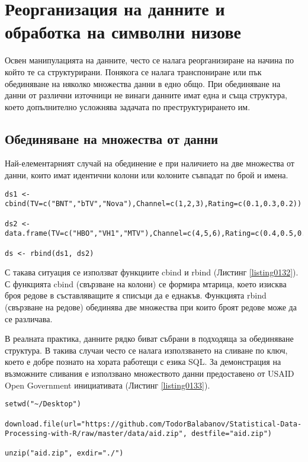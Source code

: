 ﻿\newpage
\chapter{Реорганизация на данните и обработка на символни низове}
\label{chapter07}

Освен манипулацията на данните, често се налага реорганизиране на начина по който те са структурирани. Понякога се налага транспониране или пък обединяване на няколко множества данни в едно общо. При обединяване на данни от различни източници не винаги данните имат една и съща структура, което допълнително усложнява задачата по преструктурирането им. 

\section{Обединяване на множества от данни}

Най-елементарният случай на обединение е при наличието на две множества от данни, които имат идентични колони или колоните съвпадат по брой и имена.

\begin{lstlisting}[caption=Обединяване на множества от данни, label=listing0132]
ds1 <- cbind(TV=c("BNT","bTV","Nova"),Channel=c(1,2,3),Rating=c(0.1,0.3,0.2))

ds2 <- data.frame(TV=c("HBO","VH1","MTV"),Channel=c(4,5,6),Rating=c(0.4,0.5,0.6),stringsAsFactors=FALSE)

ds <- rbind(ds1, ds2)
\end{lstlisting}

С такава ситуация се използват функциите cbind и rbind (Листинг \ref{listing0132}). С функцията cbind (свързване на колони) се формира мтарица, което изисква броя редове в съставляващите я списъци да е еднакъв. Функцията rbind (свързване на редове) обединява две множества при които броят редове може да се различава. 

В реалната практика, данните рядко биват събрани в подходяща за обединяване структура. В такива случаи често се налага използването на сливане по ключ, което е добре познато на хората работещи с езика SQL. За демонстрация на възможните сливания е използвано множеството данни предоставено от USAID Open Government инициативата (Листинг \ref{listing0133}). 

\begin{lstlisting}[caption=USAID множество от данни, label=listing0133]
setwd("~/Desktop")

download.file(url="https://github.com/TodorBalabanov/Statistical-Data-Processing-with-R/raw/master/data/aid.zip", destfile="aid.zip")

unzip("aid.zip", exdir="./")
\end{lstlisting}

